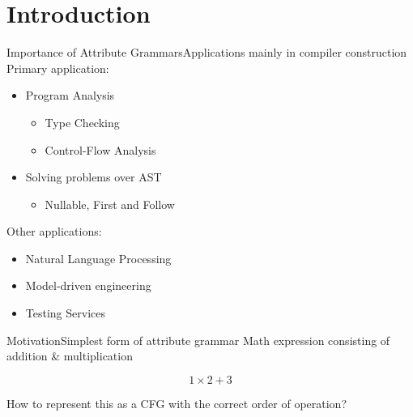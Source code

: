 \section{Introduction}

\begin{frame}{Importance of Attribute Grammars}{Applications mainly in compiler construction}
Primary application:

\begin{itemize}
    \item Program Analysis
        \begin{itemize}
            \item  Type Checking
            \item Control-Flow Analysis
        \end{itemize}
    \item Solving problems over AST
        \begin{itemize}
            \item  Nullable, First and Follow
        \end{itemize}
\end{itemize}

\emptyline

Other applications:
\begin{itemize}
    \item Natural Language Processing \cite{10.1007/978-3-642-25324-9_25}
    \item Model-driven engineering \cite{schone2020connecting}
    \item Testing Services \cite{habibisharif}
\end{itemize}
\end{frame}



\begin{frame}{Motivation}{Simplest form of attribute grammar}
Math expression consisting of addition \& multiplication

\[ 1 \times 2 + 3  \]

\newlinevspace

How to represent this as a \alert{CFG} with the correct order of operation?
\end{frame}

